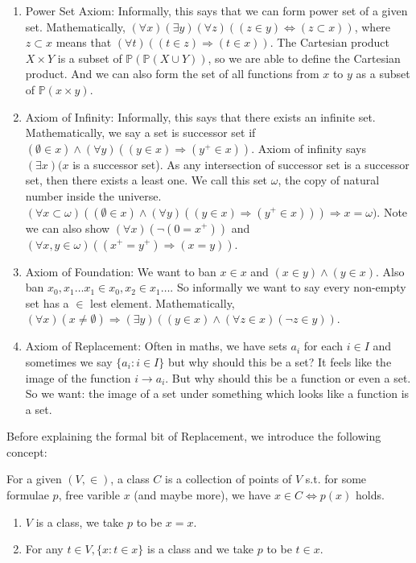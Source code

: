 \begin{enumerate}
\item Power Set Axiom: Informally, this says that we can form power set of a given set. Mathematically, $(\forall x)(\exists y)(\forall z)((z \in y) \iff (z \subset x))$, where $z \subset x$ means that $(\forall t)((t \in z) \Rightarrow (t \in x))$. The Cartesian product $X \times Y$ is a subset of $\mathbb{P}(\mathbb{P}(X \cup Y))$, so we are able to define the Cartesian product. And we can also form the set of all functions from $x$ to $y$ as a subset of $\mathbb{P}(x \times y)$.\\
\item Axiom of Infinity: Informally, this says that there exists an infinite set. Mathematically, we say a set is successor set if $(\emptyset \in x) \wedge (\forall y)((y \in x) \Rightarrow (y^+ \in x))$. Axiom of infinity says $(\exists x)(x$ is a successor set). As any intersection of successor set is a successor set, then there exists a least one. We call this set $\omega$, the copy of natural number inside the universe. $(\forall x \subset \omega)((\emptyset \in x) \wedge (\forall y)((y \in x) \Rightarrow (y^+ \in x))) \Rightarrow x= \omega)$. Note we can also show $(\forall x)(\neg (0=x^+))$ and $(\forall x,y \in \omega)((x^+ = y^+) \Rightarrow (x=y))$.\\
\item Axiom of Foundation: We want to ban $x \in x$ and $(x \in y) \wedge  (y \in x)$. Also ban $x_0,x_1 \ldots x_1 \in x_0, x_2 \in x_1 \ldots$. So informally we want to say every non-empty set has a $\in$ lest element. Mathematically, $(\forall x)(x \neq \emptyset) \Rightarrow (\exists y)((y \in x) \wedge (\forall z \in x)(\neg z \in y))$.\\
\item Axiom of Replacement: Often in maths, we have sets $a_i$ for each $i \in I$ and sometimes we say $\{a_i: i \in I\}$ but why should this be a set? It feels like the image of the function $i \rightarrow a_i$. But why should this be a function or even a set. So we want: the image of a set under something which looks like a function is a set.\\
\end{enumerate}
Before explaining the formal bit of Replacement, we introduce the following concept:
\begin{definition} For a given $(V,\in)$, a class $C$ is a collection of points of $V$ s.t. for some formulae $p$, free varible $x$ (and maybe more), we have $x \in C \iff p(x)$ holds.
\end{definition}
\begin{example}
\begin{enumerate}
\item $V$ is a class, we take $p$ to be $x=x$.\\
\item For any $t \in V, \{x: t \in x\}$ is a class and we take $p$ to be $t \in x$.
\end{enumerate}
\end{example}
